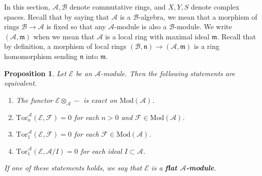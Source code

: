 \documentclass[12pt,b5paper,notitlepage]{report}
\theoremstyle{definition}
\theoremstyle{plain}
\newtheorem{pp}[df]{Proposition}
\newcommand{\fk}{\mathfrak}
\newcommand{\mc}{\mathcal}
\newcommand{\Tor}{\mathrm{Tor}}
\newcommand{\Mod}{\mathrm{Mod}}
\numberwithin{equation}{section}
\begin{document}
In this section,  $\mc A,\mc B$ denote commutative rings, and $X,Y,S$ denote complex spaces. Recall that by saying that $\mc A$ is a $\mc B$-algebra, we mean that a morphism of rings $\mc B\rightarrow\mc A$ is fixed so that any $\mc A$-module is also a $\mc B$-module. We write $(\mc A,\fk m)$ when we mean that $\mc A$ is a local ring with maximal ideal $\fk m$. Recall that by definition, a morphism of local rings $(\mc B,\fk n)\rightarrow(\mc A,\fk m)$ is a ring homomorphism sending $\fk n$ into $\fk m$.


\begin{pp}\label{lb343}
Let $\mc E$ be an $\mc A$-module. Then the following statements are equivalent.
\begin{enumerate}[label=(\arabic*)]
\item The functor $\mc E\otimes_{\mc A}-$ is exact on $\Mod(\mc A)$.
\item $\Tor_n^{\mc A}(\mc E,\mc F)=0$ for each $n>0$ and $\mc F\in\Mod(\mc A)$.
\item $\Tor_1^{\mc A}(\mc E,\mc F)=0$ for each $\mc F\in\Mod(\mc A)$.
\item $\Tor_1^{\mc A}(\mc E,\mc A/I)=0$ for each ideal $I\subset\mc A$.
\end{enumerate}
If one of these statements holds, we say that $\mc E$ is a \textbf{flat $\mc A$-module}. 
\end{pp}
\end{document}
